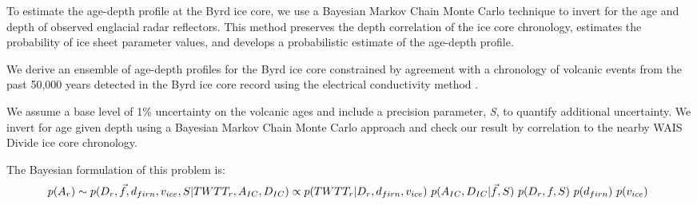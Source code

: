 


To estimate the age-depth profile at the Byrd ice core, we use a Bayesian Markov Chain Monte Carlo technique to invert for the age and depth of observed englacial radar reflectors. This method preserves the depth correlation of the ice core chronology, estimates the probability of ice sheet parameter values, and develops a probabilistic estimate of the age-depth profile. 

We derive an ensemble of age-depth profiles for the Byrd ice core constrained by agreement with a chronology of volcanic events from the past 50,000 years detected in the Byrd ice core record using the electrical conductivity method \citep{hammer1997}. 

We assume a base level of 1\% uncertainty on the volcanic ages and include a precision parameter, \textit{S}, to quantify additional uncertainty. We invert for age given depth using a Bayesian Markov Chain Monte Carlo approach and check our result by correlation to the nearby WAIS Divide ice core chronology.

The Bayesian formulation of this problem is:
\begin{equation}\label{bigproblem}
p(A_r)  \sim \\ p(D_r, \vec{f},d_{firn},v_{ice},S | TWTT_r, A_{IC}, D_{IC})  \propto
p(TWTT_r | D_r,d_{firn},v_{ice} )~p(A_{IC}, D_{IC} | \vec{f},S)~p(D_r, f, S)~p(d_{firn})~p(v_{ice})\
\end{equation}

